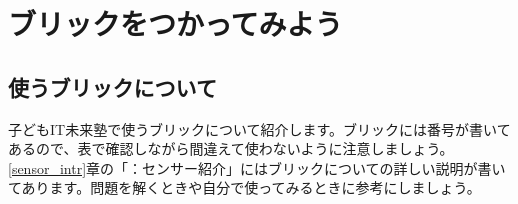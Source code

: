 \section{ブリックをつかってみよう}
\subsection{使うブリックについて}
子どもIT未来塾で使うブリックについて紹介します。ブリックには番号が書いてあるので、表で確認しながら間違えて使わないように注意しましょう。\ref{sensor_intr}章の「：センサー紹介」にはブリックについての詳しい説明が書いてあります。問題を解くときや自分で使ってみるときに参考にしましょう。\\

\newlength{\colA}
\setlength{\colA}{0.15\columnwidth}
\newlength{\colB}
\setlength{\colB}{0.15\columnwidth}
\newlength{\colC}
\setlength{\colC}{0.3\columnwidth}
\newlength{\colD}
\setlength{\colD}{0.2\columnwidth}
\newlength{\colE}
\setlength{\colE}{0.07\columnwidth}

